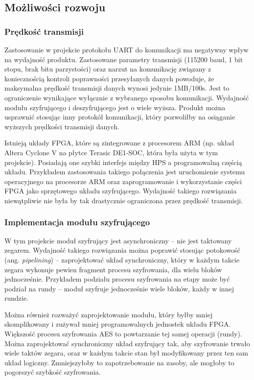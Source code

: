 \subsection{Możliwości rozwoju}

\subsubsection{Prędkość transmisji}
Zastosowanie w projekcie protokołu UART do komunikacji ma negatywny wpływ na wydajność produktu. Zastosowane parametry transmisji (115200 baud, 1 bit stopu, brak bitu parzystości) oraz narzut na komunikację związany z koniecznością kontroli poprawności przesyłanych danych powoduje, że maksymalna prędkość transmisji danych wynosi jedynie 1MB/100s. Jest to ograniczenie wynikające wyłącznie z wybranego sposobu komunikacji. Wydajność modułu szyfrującego i deszyfrującego jest o wiele wyższa. Produkt można usprawnić stosując inny protokół komunikacji, który pozwoliłby na osiąganie wyższych prędkości transmisji danych.

Istnieją układy FPGA, które są zintegrowane z procesorem ARM (np. układ Altera Cyclone V na płytce Terasic DE1-SOC, która była użyta w tym projekcie). Posiadają one szybki interfejs między HPS a programowalną częścią układu. Przykładem zastosowania takiego połączenia jest uruchomienie systemu operacyjnego na procesorze ARM oraz zaprogramowanie i wykorzystanie części FPGA jako sprzętowego układu szyfrującego. Wydajność takiego rozwiązania niewątpliwie nie była by tak drastycznie ograniczona przez prędkość transmisji.

\subsubsection{Implementacja modułu szyfrującego}
W tym projekcie moduł szyfrujący jest asynchroniczny -- nie jest taktowany zegarem. Wydajność takiego rozwiązania można poprawić stosując potokowość (ang. \textit{pipelining}) -- zaprojektować układ synchroniczny, który w każdym takcie zegara wykonuje pewien fragment procesu szyfrowania, dla wielu bloków jednocześnie. Przykładem podziału procesu szyfrowania na etapy może być podział na rundy -- moduł szyfruje jednocześnie wiele bloków, każdy w innej rundzie.

Można również rozważyć zaprojektowanie modułu, który byłby mniej skomplikowany i zużywał mniej programowalnych jednostek układu FPGA. Większość procesu szyfrowania AES to powtarzanie tej samej operacji (rundy). Można zaprojektować synchroniczny układ szyfrujący tak, aby szyfrowanie trwało wiele taktów zegara, oraz w każdym takcie stan był modyfikowany przez ten sam układ logiczny. Zmniejszyłoby to zapotrzebowanie na zasoby, ale mogłoby to pogorszyć szybkość szyfrowania.

